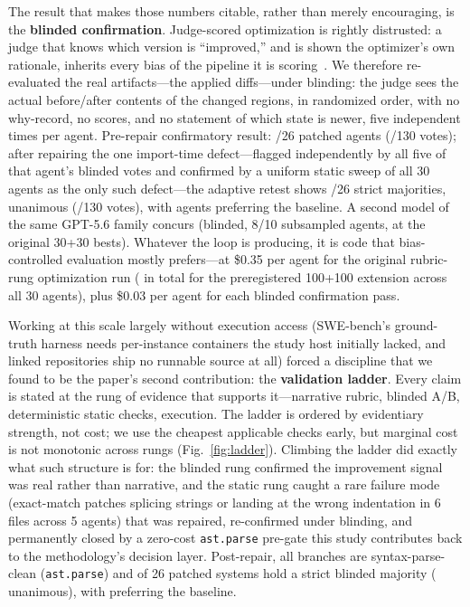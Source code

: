 \documentclass[11pt]{article}
\begin{document}
The result that makes those numbers citable, rather than merely encouraging,
is the \textbf{blinded confirmation}. Judge-scored optimization is rightly
distrusted: a judge that knows which version is ``improved,'' and is shown the
optimizer's own rationale, inherits every bias of the pipeline it is
scoring~\citep{llmjudge2023,selfpreference2024}. We therefore re-evaluated the
real artifacts---the applied diffs---under blinding: the judge sees the actual
before/after contents of the changed regions, in randomized order, with no
why-record, no scores, and no statement of which state is newer, five
independent times per agent. Pre-repair confirmatory result:
\swBlindPreMajP/26 patched agents (\swBlindPreVotesP/130 votes); after
repairing the one import-time defect---flagged independently by all five of
that agent's blinded votes and confirmed by a uniform static sweep of all 30
agents as the only such defect---the adaptive retest shows \swBlindMajP/26
strict majorities, \swBlindPerfect{} unanimous (\swBlindVotesP/130 votes),
with \swBlindMajB{} agents preferring the baseline. A second model
of the same GPT-5.6 family concurs (blinded, 8/10 subsampled agents, at the
original 30+30 bests).
Whatever the loop is producing, it is code that bias-controlled evaluation
mostly prefers---at \$0.35 per agent for the original rubric-rung
optimization run (\swPhaseBTotal{} in total for the preregistered 100+100
extension across all 30 agents), plus \$0.03 per agent for each blinded
confirmation pass.

Working at this scale largely without execution access (SWE-bench's
ground-truth harness needs per-instance containers the study host initially
lacked, and \swNoSource{} linked repositories ship no runnable source at all)
forced a discipline that we found to be the paper's second contribution: the
\textbf{validation ladder}. Every claim is stated at the rung of evidence that
supports it---narrative rubric, blinded A/B, deterministic static checks,
execution. The ladder is ordered by evidentiary strength, not cost; we use the
cheapest applicable checks early, but marginal cost is not monotonic across
rungs (Fig.~\ref{fig:ladder}). Climbing the ladder did exactly what such structure
is for: the blinded rung confirmed the improvement signal was real rather than
narrative, and the static rung caught a rare failure mode (exact-match patches
splicing strings or landing at the wrong indentation in 6 files across 5
agents) that was repaired, re-confirmed under blinding, and permanently closed
by a zero-cost \texttt{ast.parse} pre-gate this study contributes back to the
methodology's decision layer. Post-repair, all \swN{} branches are
syntax-parse-clean (\texttt{ast.parse}) and \swBlindMajP{} of 26 patched
systems hold a strict blinded majority (\swBlindPerfect{} unanimous), with
\swBlindMajB{} preferring the baseline.
\end{document}
